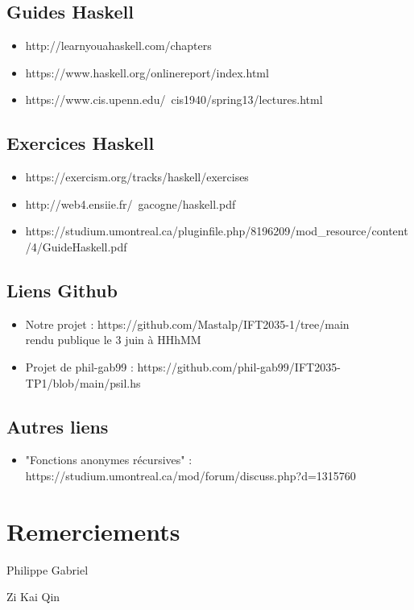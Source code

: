 \documentclass{article}
\begin{document}
\subsection{Guides Haskell}
\begin{itemize}
  \item http://learnyouahaskell.com/chapters
  \item https://www.haskell.org/onlinereport/index.html
  \item https://www.cis.upenn.edu/~cis1940/spring13/lectures.html
\end{itemize}

\subsection{Exercices Haskell}
\begin{itemize}
  \item https://exercism.org/tracks/haskell/exercises
  \item http://web4.ensiie.fr/~gacogne/haskell.pdf
  \item https://studium.umontreal.ca/pluginfile.php/8196209/mod\_resource/content/4/GuideHaskell.pdf
\end{itemize}

\subsection{Liens Github}
\begin{itemize}
  \item Notre projet : https://github.com/Mastalp/IFT2035-1/tree/main
  \\
  rendu publique le 3 juin à HHhMM
  \item Projet de phil-gab99 : https://github.com/phil-gab99/IFT2035-TP1/blob/main/psil.hs
\end{itemize}

\subsection{Autres liens}
\begin{itemize}
  \item "Fonctions anonymes récursives" : https://studium.umontreal.ca/mod/forum/discuss.php?d=1315760
\end{itemize}

\section{Remerciements}
\centerline{Philippe Gabriel}
\centerline{Zi Kai Qin}
\end{document}
